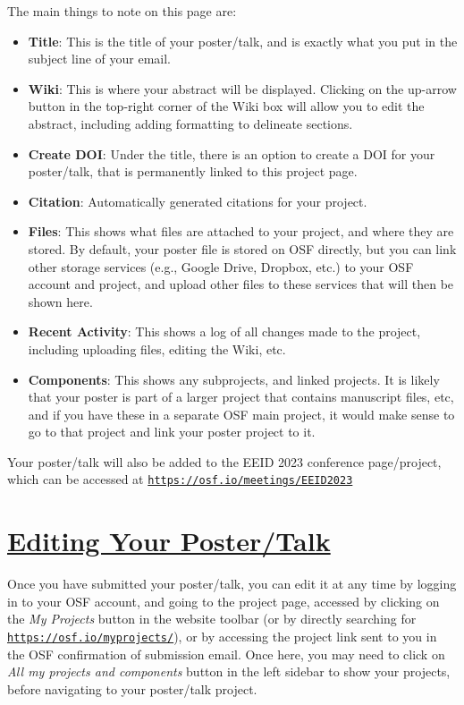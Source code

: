 \documentclass{scrartcl}
\begin{document}
The main things to note on this page are:

\begin{itemize}
    \item \textbf{Title}: This is the title of your poster/talk, and is exactly what you put in the subject line of your email.
    \item \textbf{Wiki}: This is where your abstract will be displayed.
    Clicking on the up-arrow button in the top-right corner of the Wiki box will allow you to edit the abstract, including adding formatting to delineate sections.
    \item \textbf{Create DOI}: Under the title, there is an option to create a DOI for your poster/talk, that is permanently linked to this project page.
    \item \textbf{Citation}: Automatically generated citations for your project.
    \item \textbf{Files}: This shows what files are attached to your project, and where they are stored.
    By default, your poster file is stored on OSF directly, but you can link other storage services (e.g., Google Drive, Dropbox, etc.) to your OSF account and project, and upload other files to these services that will then be shown here.
    \item \textbf{Recent Activity}: This shows a log of all changes made to the project, including uploading files, editing the Wiki, etc.
    \item \textbf{Components}: This shows any subprojects, and linked projects.
    It is likely that your poster is part of a larger project that contains manuscript files, etc, and if you have these in a separate OSF main project, it would make sense to go to that project and link your poster project to it.
\end{itemize}

Your poster/talk will also be added to the EEID 2023 conference page/project, which can be accessed at \href{https://osf.io/meetings/EEID2023}{\texttt{https://osf.io/meetings/EEID2023}}

\section{\underline{Editing Your Poster/Talk}}

Once you have submitted your poster/talk, you can edit it at any time by logging in to your OSF account, and going to the project page, accessed by clicking on the \emph{My Projects} button in the website toolbar (or by directly searching for \href{https://osf.io/myprojects/}{\texttt{https://osf.io/myprojects/}}), or by accessing the project link sent to you in the OSF confirmation of submission email.
Once here, you may need to click on \emph{All my projects and components} button in the left sidebar to show your projects, before navigating to your poster/talk project.
\end{document}
